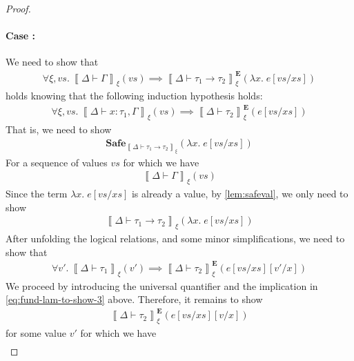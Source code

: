 \documentclass{article}
\newcommand{\semtyp}[3]{\left\llbracket #2 \vdash #3 \right\rrbracket_{#1}}
\newcommand{\semErel}[1]{#1^{\textbf{E}}}
\newcommand{\semenv}{\xi}
\newcommand{\Tctx}{\Gamma}
\newcommand{\CtxTps}{\Delta}
\newcommand{\expr}{e}
\newcommand{\val}{v}
\newcommand{\var}{x}
\newcommand{\typ}{\tau}
\newcommand{\Safe}[1]{\textbf{Safe}_{#1}}
\begin{document}
\begin{proof}
\paragraph{Case :}
We need to show that
\begin{align}
  \label{eq:fund-lam-main}
  \forall \semenv, \mathit{vs}.~\semtyp{\semenv}{\CtxTps}{\Tctx}(\mathit{vs}) \implies
  \semErel{\semtyp{\semenv}{\CtxTps}{\typ_1 \to \typ_2}}(\lambda \var.\; \expr[\mathit{vs}/\mathit{xs}])
\end{align}
holds knowing that the following induction hypothesis holds:
\begin{align}
  \label{eq:fund-lam-ih}
  \forall \semenv, \mathit{vs}.~\semtyp{\semenv}{\CtxTps}{\var : \typ_1, \Tctx}(\mathit{vs}) \implies \semErel{\semtyp{\semenv}{\CtxTps}{\typ_2}}(\expr[\mathit{vs}/\mathit{xs}])
\end{align}
That is, we need to show
\begin{align}
  \label{eq:fund-lam-to-show-1}
  \Safe{\semtyp{\semenv}{\CtxTps}{\typ_1 \to \typ_2}}(\lambda \var.\; \expr[\mathit{vs}/\mathit{xs}])
\end{align}
For a sequence of values $\mathit{vs}$ for which we have
\begin{align}
  \label{eq:fund-lam-env-rel}
  \semtyp{\semenv}{\CtxTps}{\Tctx}(\mathit{vs})
\end{align}
Since the term $\lambda \var.\; \expr[\mathit{vs}/\mathit{xs}]$ is already a value, by \ref{lem:safeval}, we only need to show
\begin{align}
  \label{eq:fund-lam-to-show-2}
  \semtyp{\semenv}{\CtxTps}{\typ_1 \to \typ_2}(\lambda \var.\; \expr[\mathit{vs}/\mathit{xs}])
\end{align}
After unfolding the logical relations, and some minor simplifications, we need to show that
\begin{align}
  \label{eq:fund-lam-to-show-3}
  \forall \val'.~\semtyp{\semenv}{\CtxTps}{\typ_1}(\val') \implies \semErel{\semtyp{\semenv}{\CtxTps}{\typ_2}}(\expr[\mathit{vs}/\mathit{xs}][\val'/\var])
\end{align}
We proceed by introducing the universal quantifier and the implication in \eqref{eq:fund-lam-to-show-3} above.
Therefore, it remains to show
\begin{align}
  \label{eq:fund-lam-to-show-4}
  \semErel{\semtyp{\semenv}{\CtxTps}{\typ_2}}(\expr[\mathit{vs}/\mathit{xs}][\val/\var])
\end{align}
for some value $\val'$ for which we have
\begin{align}

\end{align}
\end{proof}
\end{document}
